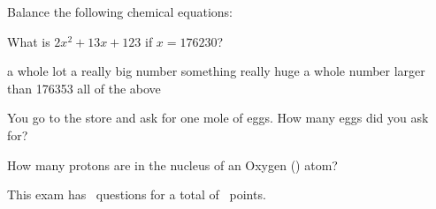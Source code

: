 \documentclass[11pt,addpoints]{exam}   	%
\begin{document}
\begin{questions}
\question
Balance the following chemical equations:
\vspace{.2in}

\question[1] 
What is $2x^2 + 13x + 123$ if $ x = 176230 $?

\begin{choices}
\choice a whole lot
\choice a really big number
\choice something really huge
\choice a whole number larger than 176353
\choice all of the above
\end{choices}

\question[1]
You go to the store and ask for one mole of eggs. How many eggs did you ask for?

\question[1] 
How many protons are in the nucleus of an Oxygen () atom?

\end{questions}

\vspace{2in}

\begin{center}
This exam has \numquestions\ questions for a total of \numpoints\ points.
\end{center}
\end{document}
